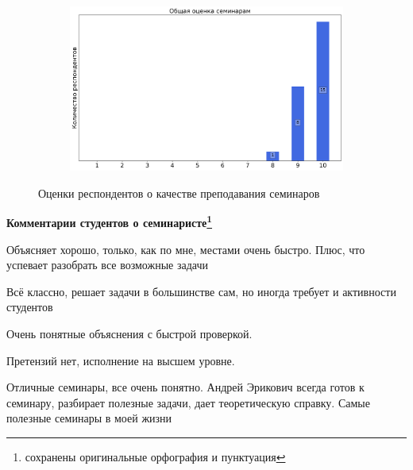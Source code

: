 \begin{figure}[H]
\begin{subfigure}[b]{0.45\textwidth}
			\end{subfigure}
			\begin{subfigure}[b]{0.45\textwidth}
				\centering
				\includegraphics[width=\textwidth]{images/3 course/ТФКП/seminarists-marks-Бунаков А.Э.-3.png}
			\end{subfigure}	
			\caption{Оценки респондентов о качестве преподавания семинаров}
		\end{figure}

		\textbf{Комментарии студентов о семинаристе\protect\footnote{сохранены оригинальные орфография и пунктуация}}
            \begin{commentbox} 
                Объясняет хорошо, только, как по мне, местами очень быстро. Плюс, что успевает разобрать все возможные задачи 
            \end{commentbox} 
        
            \begin{commentbox} 
                Всё классно, решает задачи в большинстве сам, но иногда требует и активности студентов 
            \end{commentbox} 
        
            \begin{commentbox} 
                Очень понятные объяснения с быстрой проверкой. 
            \end{commentbox} 
        
            \begin{commentbox} 
                Претензий нет, исполнение на высшем уровне. 
            \end{commentbox} 
        
            \begin{commentbox} 
                Отличные семинары, все очень понятно. Андрей Эрикович всегда готов к семинару, разбирает полезные задачи, дает теоретическую справку. Самые полезные семинары в моей жизни 
            \end{commentbox} 
        
